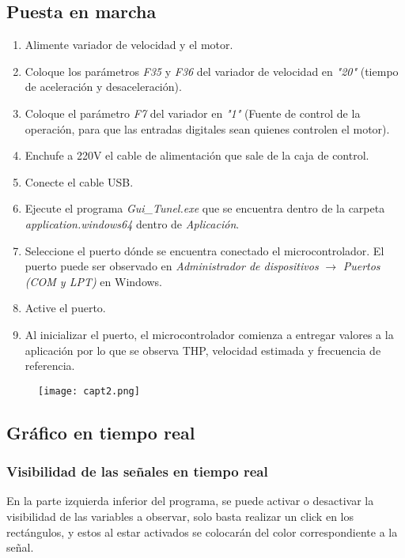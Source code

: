 \subsection{Puesta en marcha}
\begin{enumerate}
	\item Alimente variador de velocidad y el motor.
	\item Coloque los parámetros \textit{F35} y \textit{F36} del variador de velocidad en \textit{"20"} (tiempo de aceleración y desaceleración).
	\item Coloque el parámetro \textit{F7} del variador en \textit{"1"} (Fuente de control de la operación, para que las entradas digitales sean quienes controlen el motor).
	\item Enchufe a 220V el cable de alimentación que sale de la caja de control.
	\item Conecte el cable USB.
	\item Ejecute el programa \textit{Gui\_Tunel.exe} que se encuentra dentro de la carpeta \textit{application.windows64} dentro de \textit{Aplicación}.
	\item Seleccione el puerto dónde se encuentra conectado el microcontrolador.
	\subitem El puerto puede ser observado en \textit{Administrador de dispositivos} $\rightarrow$ \textit{Puertos (COM y LPT)} en Windows.
	\item Active el puerto.
	\item Al inicializar el puerto, el microcontrolador comienza a entregar valores a la aplicación por lo que se observa THP, velocidad estimada y frecuencia de referencia. 
	
\end{enumerate}

\begin{figure}[H]
	\centering
	\texttt{[image: capt2.png]}
	\label{fig:capt2}
\end{figure}



\subsection{Gráfico en tiempo real}
\subsubsection{Visibilidad de las señales en tiempo real}
En la parte izquierda inferior del programa, se puede activar o desactivar la visibilidad de las variables a observar, solo basta realizar un click en los rectángulos, y estos al estar activados se colocarán del color correspondiente a la señal.

